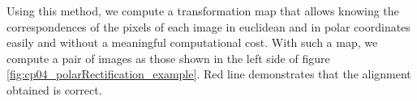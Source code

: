 Using this method, we compute a transformation map that allows knowing the correspondences of the pixels of each image in euclidean and in polar coordinates easily and without a meaningful computational cost. With such a map, we compute a pair of images as those shown in the left side of figure \ref{fig:cp04_polarRectification_example}. Red line demonstrates that the alignment obtained is correct. 
